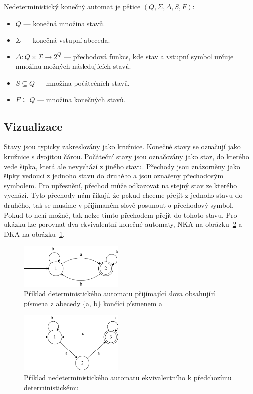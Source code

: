 \noindent Nedeterministický konečný automat je pětice $(Q, \Sigma, \Delta, S, F)$\cite{Viswanathan_2017}:
\begin{itemize}
	\item $Q$ --- konečná množina stavů.
	\item $\Sigma$ --- konečná vstupní abeceda.
	\item $\Delta: Q \times \Sigma \rightarrow 2^Q$ --- přechodová funkce, kde stav a vstupní symbol určuje množinu možných následujících stavů.
	\item $S \subseteq Q$ --- množina počátečních stavů.
	\item $F \subseteq Q$ --- množina konečných stavů.
\end{itemize}

\subsection*{Vizualizace}

Stavy jsou typicky zakreslovány jako kružnice. 
Konečné stavy se označují jako kružnice s dvojitou čárou. 
Počáteční stavy jsou označovány jako stav, do kterého vede šipka, která ale nevychází z jiného stavu.
Přechody jsou znázorněny jako šipky vedoucí z jednoho stavu do druhého a jsou označeny přechodovým symbolem.
Pro upřesnění, přechod může odkazovat na stejný stav ze kterého vychází.
Tyto přechody nám říkají, že pokud chceme přejít z jednoho stavu do druhého, tak se musíme v přijímaném slově posunout o přechodový symbol. 
Pokud to není možné, tak nelze tímto přechodem přejít do tohoto stavu.
Pro ukázku lze porovnat dva ekvivalentní konečné automaty, NKA na obrázku~\ref{fig:NFAex} a DKA na obrázku~\ref{fig:DFAex}.

\begin{figure}[!h]
	\centering
	\includegraphics[width=0.45\textwidth]{Figures/DFA_example.pdf}
	\caption{Příklad deterministického automatu přijímající slova obsahující písmena z abecedy \{a, b\} končící písmenem a}
	\label{fig:DFAex}
\end{figure}

\begin{figure}[!h]
	\centering
	\includegraphics[width=0.45\textwidth]{Figures/NFA_example.pdf}
	\caption{Příklad nedeterministického automatu ekvivalentního k předchozímu deterministickému}
	\label{fig:NFAex}
\end{figure}

